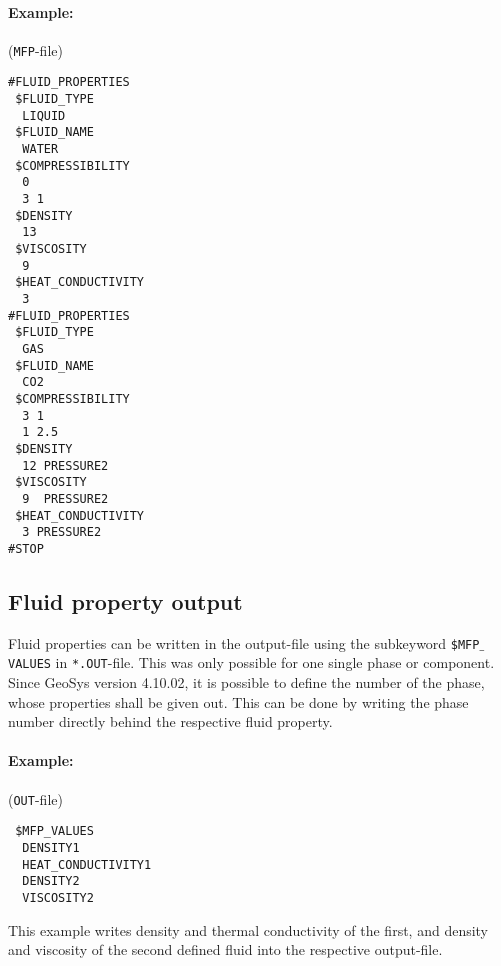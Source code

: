 \paragraph{Example:}
(\texttt{MFP}-file)
\begin{verbatim}
#FLUID_PROPERTIES
 $FLUID_TYPE
  LIQUID
 $FLUID_NAME
  WATER
 $COMPRESSIBILITY
  0
  3 1
 $DENSITY
  13    
 $VISCOSITY
  9
 $HEAT_CONDUCTIVITY
  3
#FLUID_PROPERTIES
 $FLUID_TYPE
  GAS
 $FLUID_NAME
  CO2
 $COMPRESSIBILITY
  3 1
  1 2.5
 $DENSITY
  12 PRESSURE2
 $VISCOSITY
  9  PRESSURE2
 $HEAT_CONDUCTIVITY
  3 PRESSURE2
#STOP
\end{verbatim}

\subsection{Fluid property output}

Fluid properties can be written in the output-file using the subkeyword \texttt{\$MFP$\_\,$VALUES} in \texttt{*.OUT}-file. This was only possible for one single phase or component. Since GeoSys version 4.10.02, it is possible to define the number of the phase, whose properties shall be given out. This can be done by writing the phase number directly behind the respective fluid property.

\paragraph{Example:}
(\texttt{OUT}-file)
\begin{verbatim}
 $MFP_VALUES
  DENSITY1
  HEAT_CONDUCTIVITY1
  DENSITY2
  VISCOSITY2
\end{verbatim}

This example writes density and thermal conductivity of the first, and density and viscosity of the second defined fluid into the respective output-file.

